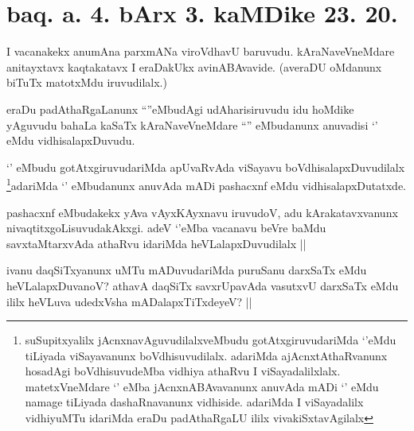 \section*{baq. a. 4. bArx 3. kaMDike 23. 20.}

\begin{artha}
I vacanakekx anumAna parxmANa viroVdhavU baruvudu. kAraNaveVneMdare anitayxtavx kaqtakatavx I eraDakUkx avinABAvavide. (averaDU oMdanunx biTuTx matotxMdu iruvudilalx.)
\end{artha}


\begin{artha}
eraDu padAthaRgaLanunx ``\stext''eMbudAgi udAharisiruvudu idu hoMdike yAguvudu bahaLa kaSaTx kAraNaveVneMdare ``\stext'' eMbudanunx anuvadisi `\stext' eMdu vidhisalapxDuvudu.
\end{artha}


\begin{artha}
`\stext' eMbudu gotAtxgiruvudariMda apUvaRvAda viSayavu boVdhisalapxDuvudilalx \footnote{suSupitxyalilx jAcnxnavAguvudilalxveMbudu gotAtxgiruvudariMda `\stext'eMdu tiLiyada viSayavanunx boVdhisuvudilalx. adariMda ajAcnxtAthaRvanunx hosadAgi boVdhisuvudeMba vidhiya athaRvu I viSayadalilxlalx. matetxVneMdare `\stext' eMba jAcnxnABAvavanunx anuvAda mADi `\stext' eMdu namage tiLiyada dashaRnavanunx vidhiside. adariMda I viSayadalilx vidhiyuMTu idariMda eraDu padAthaRgaLU ililx vivakiSxtavAgilalx}adariMda `\stext' eMbudanunx anuvAda mADi pashacxnf eMdu vidhisalapxDutatxde.
\end{artha}


\begin{artha}
pashacxnf eMbudakekx yAva vAyxKAyxnavu iruvudoV, adu kArakatavxvanunx nivaqtitxgoLisuvudakAkxgi. adeV `\stext'eMba vacanavu beVre baMdu savxtaMtarxvAda athaRvu idariMda heVLalapxDuvudilalx ||
\end{artha}


\begin{artha}
ivanu daqSiTxyanunx uMTu mADuvudariMda puruSanu darxSaTx eMdu heVLalapxDuvanoV? athavA daqSiTx savxrUpavAda vasutxvU darxSaTx eMdu ililx heVLuva udedxVsha mADalapxTiTxdeyeV? ||
\end{artha}

